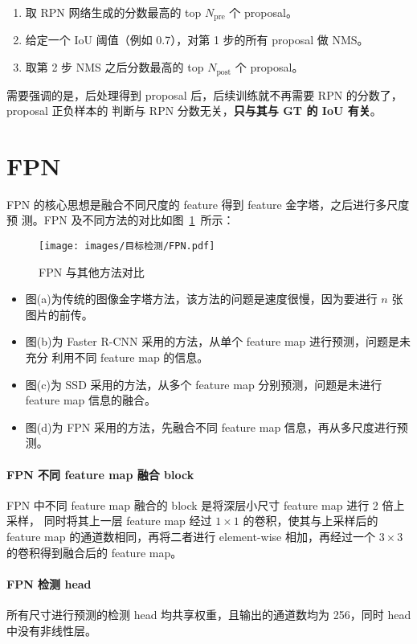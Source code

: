 \begin{enumerate}
  \item 取 RPN 网络生成的分数最高的 top $N_{\mathrm{pre}}$ 个 proposal。
  \item 给定一个 IoU 阈值（例如 0.7），对第 1 步的所有 proposal 做 NMS。
  \item 取第 2 步 NMS 之后分数最高的 top $N_{\mathrm{post}}$ 个 proposal。
\end{enumerate}

需要强调的是，后处理得到 proposal 后，后续训练就不再需要 RPN 的分数了，proposal 正负样本的
判断与 RPN 分数无关，\textbf{只与其与 GT 的 IoU 有关}。

\section{FPN}
\label{sec:FPN}

FPN 的核心思想是融合不同尺度的 feature 得到 feature 金字塔，之后进行多尺度预
测。FPN 及不同方法的对比如图~\ref{fig:FPN}~所示：

\begin{figure}[ht]
  \centering
  \texttt{[image: images/目标检测/FPN.pdf]}
  \caption{FPN 与其他方法对比}
  \label{fig:FPN}
\end{figure}

\begin{itemize}
  \item 图(a)为传统的图像金字塔方法，该方法的问题是速度很慢，因为要进行 $n$ 张
    图片的前传。
  \item 图(b)为 Faster R-CNN 采用的方法，从单个 feature map 进行预测，问题是未充分
    利用不同 feature map 的信息。
  \item 图(c)为 SSD 采用的方法，从多个 feature map 分别预测，问题是未进行
    feature map 信息的融合。
  \item 图(d)为 FPN 采用的方法，先融合不同 feature map 信息，再从多尺度进行预测。
\end{itemize}

\paragraph{FPN 不同 feature map 融合 block}
FPN 中不同 feature map 融合的 block 是将深层小尺寸 feature map 进行 2 倍上采样，
同时将其上一层 feature map 经过 $1 \times 1$ 的卷积，使其与上采样后的 feature
map 的通道数相同，再将二者进行 element-wise 相加，再经过一个 $3 \times 3$
的卷积得到融合后的 feature map。

\paragraph{FPN 检测 head}
所有尺寸进行预测的检测 head 均共享权重，且输出的通道数均为 256，同时 head
中没有非线性层。

